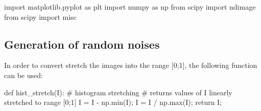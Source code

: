 \def\QRCODE{TB_image_TUT.IMG.image_restoration_denoising_pythonqrcode.png}
\def\QRPAGE{http://www.iptutorials.science/tree/master/TB_image/TUT.IMG.image_restoration_denoising/python}

\begin{python}
import matplotlib.pyplot as plt
import numpy as np
from scipy import ndimage
from scipy import misc
\end{python}


\subsection{Generation of random noises}
In order to convert stretch the images into the range [0;1], the following function can be used:

\begin{python}
def hist_stretch(I):
    # histogram stretching
    # returns values of I linearly stretched to range [0;1]
    I = I - np.min(I);
    I = I / np.max(I);
    return I;
\end{python}


